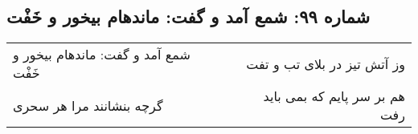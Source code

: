 \begin{center}
\section*{شماره ۹۹: شمع آمد و گفت: ماندهام بیخور و خَفْت}
\label{sec:099}
\begin{longtable}{l p{0.5cm} r}
شمع آمد و گفت: ماندهام بیخور و خَفْت
&&
وز آتش تیز در بلای تب و تفت
\\
گرچه بنشانند مرا هر سحری
&&
هم بر سر پایم که بمی باید رفت
\\
\end{longtable}
\end{center}
